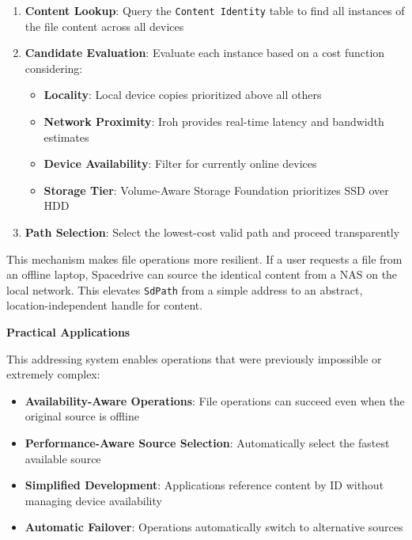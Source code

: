 \documentclass[sigconf]{acmart}
\begin{document}
\begin{enumerate}[noitemsep, topsep=0pt]
    \item \textbf{Content Lookup}: Query the \texttt{Content Identity} table to find all instances of the file content across all devices

    \item \textbf{Candidate Evaluation}: Evaluate each instance based on a cost function considering:
    \begin{itemize}[noitemsep]
        \item \textbf{Locality}: Local device copies prioritized above all others
        \item \textbf{Network Proximity}: Iroh provides real-time latency and bandwidth estimates
        \item \textbf{Device Availability}: Filter for currently online devices
        \item \textbf{Storage Tier}: Volume-Aware Storage Foundation prioritizes SSD over HDD
    \end{itemize}

    \item \textbf{Path Selection}: Select the lowest-cost valid path and proceed transparently
\end{enumerate}

This mechanism makes file operations more resilient. If a user requests a file from an offline laptop, Spacedrive can source the identical content from a NAS on the local network. This elevates \texttt{SdPath} from a simple address to an abstract, location-independent handle for content.

\textbf{Practical Applications}

This addressing system enables operations that were previously impossible or extremely complex:

\begin{itemize}[noitemsep, topsep=0pt]
 \item \textbf{Availability-Aware Operations}: File operations can succeed even when the original source is offline
 \item \textbf{Performance-Aware Source Selection}: Automatically select the fastest available source
 \item \textbf{Simplified Development}: Applications reference content by ID without managing device availability
 \item \textbf{Automatic Failover}: Operations automatically switch to alternative sources
\end{itemize}
\end{document}
